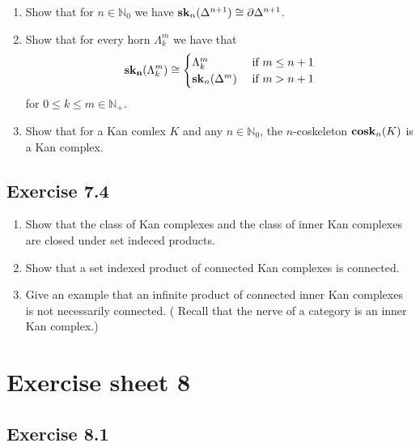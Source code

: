 \begin{enumerate}[label=(\alph*)]
    
    \item 
    Show that for $ n \in \mathbb{N}_0 $ we have $ \bold{sk}_n ( \Delta^{n+1} ) \cong \partial \Delta^{n+1}$.

    \item 
    Show that for every horn $ \Lambda_k^m $ we have that 
    \[
        \bold{sk_n} ( \Lambda_k^m ) \cong 
        \begin{cases}
            \Lambda_k^m &\text{ if } m \leq n+1
            \\
            \bold{sk}_n ( \Delta^m ) &\text{ if } m > n+1
        \end{cases}
    \]
    for $ 0 \leq k \leq m \in \mathbb{ N }_+$.

    \item 
    Show that for a Kan comlex $ K $ and any $ n \in \mathbb{N}_0 $, the $ n $-coskeleton $\bold{cosk}_n ( K ) $ is a Kan complex.
    
\end{enumerate}

\subsection{Exercise 7.4}
\begin{enumerate}[label=(\alph*)]
    \item 
    Show that the class of Kan complexes and the class of inner Kan complexes are closed under set indeced products.

    \item 
    Show that a set indexed product of connected Kan complexes is connected.

    \item 
    Give an example that an infinite product of connected inner Kan complexes is not necessarily connected. 
    ( Recall that the nerve of a category is an inner Kan complex.)
\end{enumerate}

\section{Exercise sheet 8}

\subsection{Exercise 8.1}

